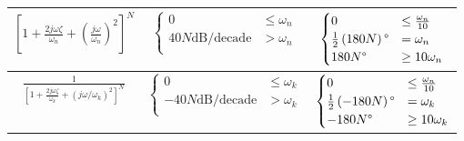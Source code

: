 \begin{table}[!h]
\begin{tabular}{|c|c|c|}
				$\left[ 1 + \frac{2 j \omega \zeta}{\omega_{n}} + \left( \frac{j \omega}{\omega_{n}} \right)^{2} \right]^{N}$ & $\begin{cases}
					0 & \leq \omega_{n} \\
					40N \text{dB/decade} & > \omega_{n} \\
				\end{cases}$
				&
				$\begin{cases}
					0 & \leq \frac{\omega_{n}}{10} \\
					\frac{1}{2} \left( 180 N \right) \degree & = \omega_{n} \\
					180N \degree & \geq 10 \omega_{n} \\
				\end{cases}$
				\\ \hline
				
				$\frac{1}{\left[ 1 + \frac{2 j \omega \zeta}{\omega_{k}} + \left( j \omega / \omega_{k} \right)^{2} \right]^{N}}$ & $\begin{cases}
					0 & \leq \omega_{k} \\
					-40N \text{dB/decade} & > \omega_{k} \\
				\end{cases}$
				&
				$\begin{cases}
					0 & \leq \frac{\omega_{n}}{10} \\
					\frac{1}{2} \left( -180 N \right) \degree & = \omega_{k} \\
					-180N \degree & \geq 10 \omega_{k} \\	
				\end{cases}$
				\\ \hline
		\end{tabular}
	\end{table}
\vspace{-5mm}